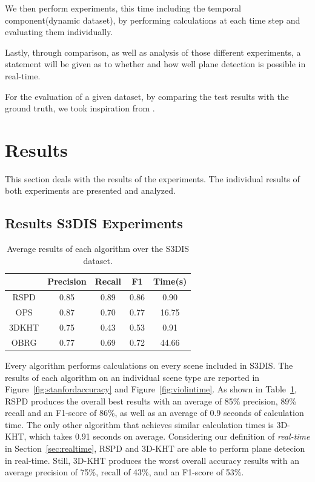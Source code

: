 \documentclass[main.tex]{subfiles}
\begin{document}
We then perform experiments, this time including the temporal component(dynamic dataset), by performing calculations at each time step and evaluating them individually.

Lastly, through comparison, as well as analysis of those different experiments, a statement will be given as to whether and how well plane detection is
possible in real-time.

For the evaluation of a given dataset, by comparing the test results with the ground truth, we took inspiration from \citeauthor{Araújo_Oliveira_2020} \cite[Section~4]{Araújo_Oliveira_2020}.


\section{Results}
This section deals with the results of the experiments. The individual results of both experiments are presented and analyzed. 

\subsection{Results S3DIS Experiments}

\begin{table}[H]
    \centering
    \begin{tabular}{c|cccc}
              & Precision & Recall & F1   & Time(s) \\ \hline
        RSPD  & 0.85      & 0.89   & 0.86 & 0.90    \\
        OPS   & 0.87      & 0.70   & 0.77 & 16.75   \\
        3DKHT & 0.75      & 0.43   & 0.53 & 0.91    \\
        OBRG  & 0.77      & 0.69   & 0.72 & 44.66
    \end{tabular}
    \caption[Overall S3DIS Results]{Average results of each algorithm over the S3DIS dataset.}
    \label{tab:algo-acc}
\end{table}

Every algorithm performs calculations on every scene included in S3DIS.
The results of each algorithm on an individual scene type are reported in Figure~\ref{fig:stanfordaccuracy} and Figure~\ref{fig:violintime}. As shown in Table~\ref{tab:algo-acc},
RSPD produces the overall best results with an average of 85\% precision, 89\% recall and an F1-score of 86\%, as well as an average of 0.9 seconds of calculation time.
The only other algorithm that achieves similar calculation times is 3D-KHT, which takes 0.91 seconds on average. Considering our definition of \textit{real-time} in Section~\ref{sec:realtime},
RSPD and 3D-KHT are able to perform plane detecion in real-time. Still, 3D-KHT produces the worst overall accuracy results with an average precision of 75\%, recall of 43\%, and an F1-score of 53\%.
\end{document}
